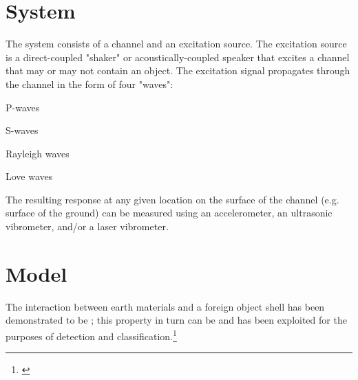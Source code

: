 \section{System}
The system consists of a channel and an excitation source.
The excitation source is a direct-coupled "shaker" or acoustically-coupled speaker
that excites a channel that may or may not contain an object.
The excitation signal propagates through the channel in the form of four "waves":
\begin{enume}
  \item P-waves
  \item S-waves
  \item Rayleigh waves
  \item Love waves
\end{enume}
The resulting response at any given location on the surface of the channel (e.g. surface of the ground)
can be measured using an accelerometer, an ultrasonic vibrometer, and/or a laser vibrometer.

\section{Model}
The interaction between earth materials and a  foreign object shell 
has been demonstrated to be ; this property in turn can be and has been exploited 
for the purposes of detection and classification.\footnote{
  \cite{donskoy1998}}



